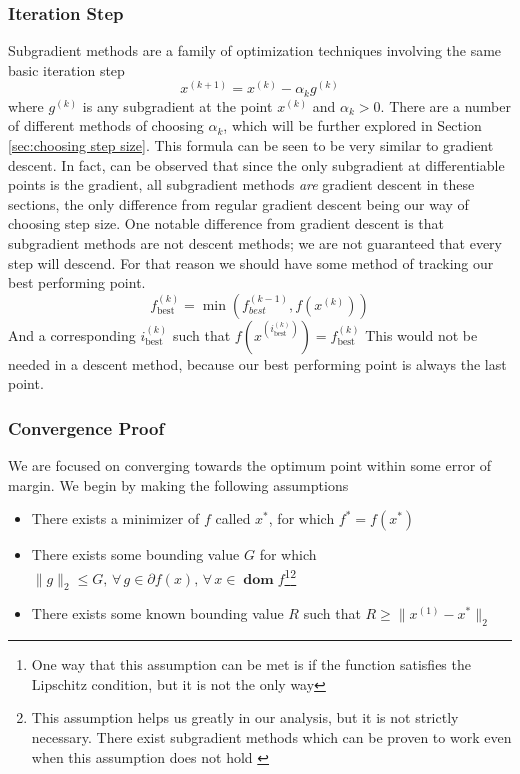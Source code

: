 \documentclass[journal,onecolumn]{IEEEtran}
\DeclareMathOperator{\dom}{\mathbf{dom}}
\DeclareMathOperator{\best}{best}
\let\oldforall\forall
\renewcommand{\forall}{ \, \oldforall \, }
\begin{document}
\subsubsection{Iteration Step}
Subgradient methods are a family of optimization techniques involving the same basic iteration step
\begin{equation}\label{eq:subgradient method iteration}
x^{(k+1)} = x^{(k)} - \alpha_k g^{(k)}
\end{equation}
where \(g^{(k)}\) is any subgradient at the point \(x^{(k)}\) and \(\alpha_k > 0\). There are a number of different methods of choosing \(\alpha_k\), which will be further explored in Section \ref{sec:choosing step size}. This formula can be seen to be very similar to gradient descent. In fact, can be observed that since the only subgradient at differentiable points is the gradient, all subgradient methods \textit{are} gradient descent in these sections, the only difference from regular gradient descent being our way of choosing step size. One notable difference from gradient descent is that subgradient methods are not descent methods; we are not guaranteed that every step will descend. For that reason we should have some method of tracking our best performing point.
\begin{equation}\label{eq:track best}
f^{(k)}_{\best} = \min (f^{(k-1)}_{best}, f(x^{(k)}))
\end{equation}
And a corresponding \(i^{(k)}_{\best}\) such that \(f(x^{(i^{(k)}_{\best})}) = f^{(k)}_{\best}\)
This would not be needed in a descent method, because our best performing point is always the last point.

\subsubsection{Convergence Proof}
We are focused on converging towards the optimum point within some error of margin. We begin by making the following assumptions
\begin{itemize}
    \item There exists a minimizer of \(f\) called \(x^*\), for which \(f^* = f(x^*)\)
    \item There exists some bounding value \(G\) for which \(\|g\|_2 \leq G, \forall g \in \partial f(x), \forall x \in \dom f\)\footnote{One way that this assumption can be met is if the function satisfies the Lipschitz condition, but it is not the only way}\footnote{This assumption helps us greatly in our analysis, but it is not strictly necessary. There exist subgradient methods which can be proven to work even when this assumption does not hold \cite{boydparksubgradients}}
    \item There exists some known bounding value \(R\) such that \(R \geq \|x^{(1)}-x^*\|_2\)
\end{itemize}
\end{document}
